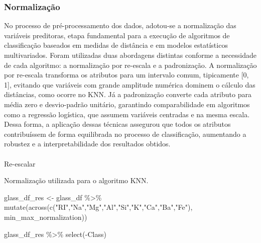 \documentclass[
  letterpaper,
  DIV=11,
  numbers=noendperiod]{scrartcl}
\makeatletter
\let\oldparagraph\paragraph
\renewcommand{\paragraph}{
    \@ifstar
      \xxxParagraphStar
      \xxxParagraphNoStar
  }
\newcommand{\xxxParagraphStar}[1]{\oldparagraph*{#1}\mbox{}}
\newcommand{\xxxParagraphNoStar}[1]{\oldparagraph{#1}\mbox{}}
\newenvironment{Shaded}{\begin{snugshade}}{\end{snugshade}}
\newcommand{\FunctionTok}[1]{\textcolor[rgb]{0.28,0.35,0.67}{#1}}
\newcommand{\NormalTok}[1]{\textcolor[rgb]{0.00,0.23,0.31}{#1}}
\newcommand{\OtherTok}[1]{\textcolor[rgb]{0.00,0.23,0.31}{#1}}
\newcommand{\SpecialCharTok}[1]{\textcolor[rgb]{0.37,0.37,0.37}{#1}}
\newcommand{\StringTok}[1]{\textcolor[rgb]{0.13,0.47,0.30}{#1}}
\makeatother
\begin{document}
\subsubsection{Normalização}\label{normalizauxe7uxe3o-1}

No processo de pré-processamento dos dados, adotou-se a normalização das
variáveis preditoras, etapa fundamental para a execução de algoritmos de
classificação baseados em medidas de distância e em modelos estatísticos
multivariados. Foram utilizadas duas abordagens distintas conforme a
necessidade de cada algoritmo: a normalização por re-escala e a
padronização. A normalização por re-escala transforma os atributos para
um intervalo comum, tipicamente {[}0, 1{]}, evitando que variáveis com
grande amplitude numérica dominem o cálculo das distâncias, como ocorre
no KNN. Já a padronização converte cada atributo para média zero e
desvio-padrão unitário, garantindo comparabilidade em algoritmos como a
regressão logística, que assumem variáveis centradas e na mesma escala.
Dessa forma, a aplicação dessas técnicas assegurou que todos os
atributos contribuíssem de forma equilibrada no processo de
classificação, aumentando a robustez e a interpretabilidade dos
resultados obtidos.

\paragraph{Re-escalar}\label{re-escalar-1}

Normalização utilizada para o algoritmo KNN.

\begin{Shaded}
\begin{Highlighting}[]
\NormalTok{glass\_df\_res }\OtherTok{\textless{}{-}}\NormalTok{ glass\_df }\SpecialCharTok{\%\textgreater{}\%} 
  \FunctionTok{mutate}\NormalTok{(}\FunctionTok{across}\NormalTok{(}\FunctionTok{c}\NormalTok{(}\StringTok{"RI"}\NormalTok{,}\StringTok{"Na"}\NormalTok{,}\StringTok{"Mg"}\NormalTok{,}\StringTok{"Al"}\NormalTok{,}\StringTok{"Si"}\NormalTok{,}\StringTok{"K"}\NormalTok{,}\StringTok{"Ca"}\NormalTok{,}\StringTok{"Ba"}\NormalTok{,}\StringTok{"Fe"}\NormalTok{), min\_max\_normalization))}

\NormalTok{glass\_df\_res }\SpecialCharTok{\%\textgreater{}\%} 
  \FunctionTok{select}\NormalTok{(}\SpecialCharTok{{-}}\NormalTok{Class)}
\end{Highlighting}
\end{Shaded}
\end{document}
